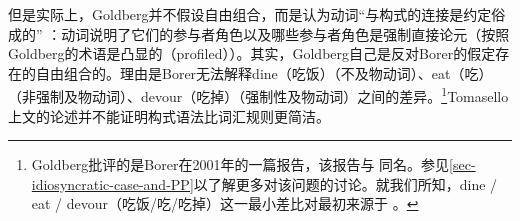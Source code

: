 \noindent
    但是实际上，Goldberg并不假设自由组合，而是认为动词“与构式的连接是约定俗成的” \citep[]{Goldberg95a}：动词说明了它们的参与者角色以及哪些参与者角色是强制直接论元（按照Goldberg的术语是凸显的（profiled））。其实，Goldberg自己\citeyearpar[]{Goldberg2006a}是反对Borer的假定存在的自由组合的\citeyearpar{Borer2003a-u}。理由是Borer无法解释dine（吃饭）（不及物动词）、eat（吃）（非强制及物动词）、devour（吃掉）（强制性及物动词）之间的差异。\footnote{Goldberg批评的是Borer在2001年的一篇报告，该报告与 同名。参见\ref{sec-idiosyncratic-case-and-PP}以了解更多对该问题的讨论。就我们所知，dine / eat / devour（吃饭/吃/吃掉）这一最小差比对最初来源于 \citet[--90]{Dowty89b-u}。}Tomasello上文的论述并不能证明构式语法比词汇规则更简洁。

